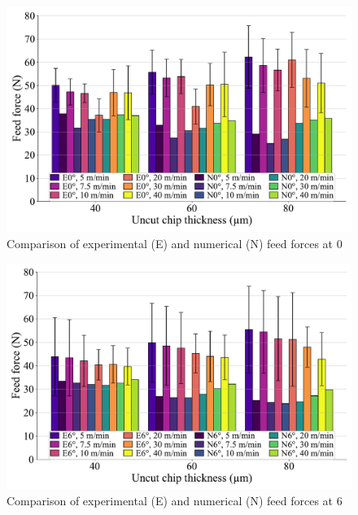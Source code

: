 \documentclass[preprint,12pt,times]{elsarticle}
\begin{document}
\begin{figure}[h]
\centering
\includegraphics[width = 140 mm]{Figures/Fy_0}
\caption{Comparison of experimental (E) and numerical (N) feed forces at 0\textdegree{}}
\label{Fy_0}
\end{figure}

\begin{figure}[h]
\centering
\includegraphics[width = 140 mm]{Figures/Fy_6}
\caption{Comparison of experimental (E) and numerical (N) feed forces at 6\textdegree{}}
\label{Fy_6}
\end{figure}
\end{document}
